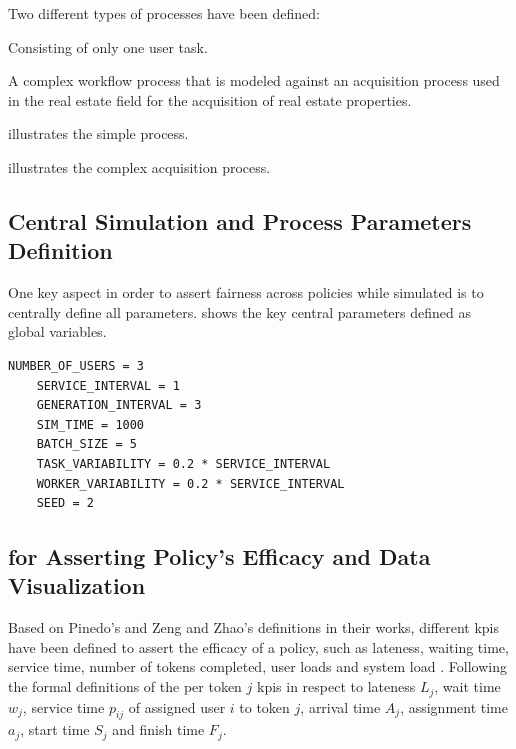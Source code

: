 \documentclass{seal_thesis}
\begin{document}
Two different types of processes have been defined:
\begin{enumerate*}
	\item Consisting of only one user task.
	\item A complex workflow process that is modeled against an acquisition process used in the real estate field for the acquisition of real estate properties.
\end{enumerate*}

 illustrates the simple process.


 illustrates the complex acquisition process.


\subsection{Central Simulation and Process Parameters Definition}

One key aspect in order to assert fairness across policies while simulated is to centrally define all parameters.  shows the key central parameters defined as global variables.

\begin{lstlisting}[caption=Central parameters definition that ensures fairness across simulation runs,label=lst:central_parameters,style=CustomPython]
	NUMBER_OF_USERS = 3
	SERVICE_INTERVAL = 1
	GENERATION_INTERVAL = 3
	SIM_TIME = 1000
	BATCH_SIZE = 5
	TASK_VARIABILITY = 0.2 * SERVICE_INTERVAL
	WORKER_VARIABILITY = 0.2 * SERVICE_INTERVAL
	SEED = 2
\end{lstlisting}

\subsection{ for Asserting Policy's Efficacy and Data Visualization}

Based on Pinedo's and Zeng and Zhao's definitions in their works, different \glspl{kpi} have been defined to assert the efficacy of a policy, such as lateness, waiting time, service time, number of tokens completed, user loads and system load \cite{Pinedo2008,Zeng2005}. Following the formal definitions of the per token $j$ \glspl{kpi} in respect to lateness $L_j$, wait time $w_j$, service time $p_{ij}$ of assigned user $i$ to token $j$, arrival time $A_j$, assignment time $a_j$, start time $S_j$ and finish time $F_j$.
\end{document}

